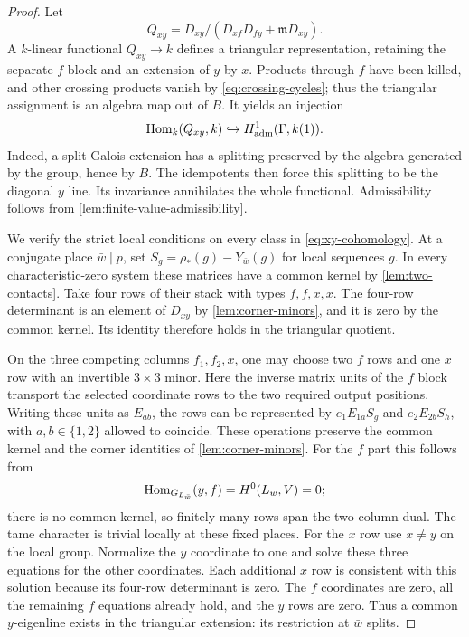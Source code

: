 \begin{proof}
Let
\[
 Q_{xy}=D_{xy}/(D_{xf}D_{fy}+\mathfrak mD_{xy}).
\]
A $k$-linear functional $Q_{xy}\to k$ defines a triangular
representation, retaining the separate $f$ block and an extension
of $y$ by $x$.  Products through $f$ have been killed, and other
crossing products vanish by \cref{eq:crossing-cycles}; thus the
triangular assignment is an algebra map out of $B$.  It yields an
injection
\begin{equation}
 \operatorname{Hom}_k(Q_{xy},k)\hookrightarrow H^1_{\mathrm{adm}}(\Gamma,k(1)).
 \label{eq:xy-cohomology}
\end{equation}
Indeed, a split Galois extension has a splitting preserved by the
algebra generated by the group, hence by $B$.  The idempotents then
force this splitting to be the diagonal $y$ line.  Its invariance
annihilates the whole functional.  Admissibility follows from
\cref{lem:finite-value-admissibility}.

We verify the strict local conditions on every class in
\cref{eq:xy-cohomology}.  At a conjugate place $\bar w\mid p$, set
$S_g=\rho_*(g)-Y_{\bar w}(g)$ for local sequences $g$.
In every characteristic-zero system these matrices have a common
kernel by \cref{lem:two-contacts}.  Take four rows of their stack
with types $f,f,x,x$.  The four-row determinant is an element of
$D_{xy}$ by \cref{lem:corner-minors}, and it is zero by the common
kernel.  Its identity therefore holds in the triangular quotient.

On the three competing columns $f_1,f_2,x$, one may choose two
$f$ rows and one $x$ row with an invertible $3\times3$ minor.
Here the inverse matrix units of the $f$ block transport the selected
coordinate rows to the two required output positions.  Writing these
units as $E_{ab}$, the rows can be represented by
$e_1E_{1a}S_g$ and $e_2E_{2b}S_h$, with $a,b\in\{1,2\}$ allowed
to coincide.  These operations preserve the common kernel and the
corner identities of \cref{lem:corner-minors}.
For the $f$ part this follows from
\[
 \operatorname{Hom}_{G_{L_{\bar w}}}(y,f)
       =H^0(L_{\bar w},V)=0;
\]
there is no common kernel, so finitely many rows span the two-column
dual.  The tame character is trivial locally at these fixed places.
For the $x$ row use $x\ne y$ on the local group.
Normalize the $y$ coordinate to one and solve these three equations
for the other coordinates.  Each additional $x$ row is consistent
with this solution because its four-row determinant is zero.
The $f$ coordinates are zero, all the remaining $f$ equations
already hold, and the $y$ rows are zero.  Thus a common $y$-eigenline
exists in the triangular extension: its restriction at $\bar w$
splits.


\end{proof}

